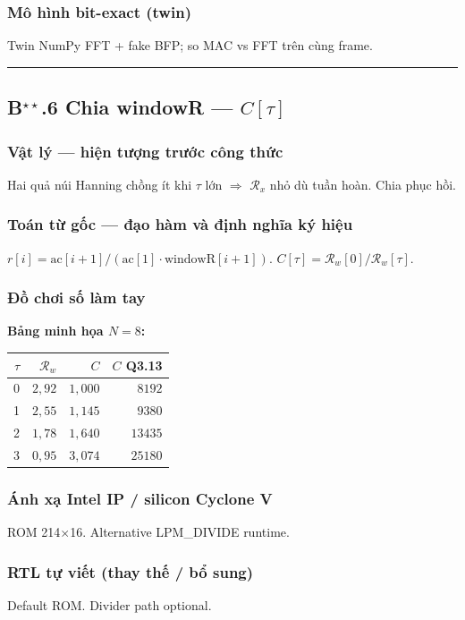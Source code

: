 \subsubsection*{Mô hình bit-exact (twin)}
Twin NumPy FFT + fake BFP; so MAC vs FFT trên cùng frame.
\vspace{0.4cm}\hrule\vspace{0.4cm}
\subsection*{B$^{\star\star}$.6 Chia windowR --- $C[\tau]$}
\subsubsection*{Vật lý --- hiện tượng trước công thức}
Hai quả núi Hanning chồng ít khi $\tau$ lớn $\Rightarrow$ $\mathcal{R}_x$ nhỏ dù tuần hoàn. Chia phục hồi.
\subsubsection*{Toán từ gốc --- đạo hàm và định nghĩa ký hiệu}
$r[i]=\mathrm{ac}[i+1]/(\mathrm{ac}[1]\cdot\mathrm{windowR}[i+1])$. $C[\tau]=\mathcal{R}_w[0]/\mathcal{R}_w[\tau]$.
\subsubsection*{Đồ chơi số làm tay}
\textbf{Bảng minh họa $N=8$:}
\begin{center}
\small
\begin{tabular}{@{}rrrr@{}}
\toprule
$\tau$ & $\mathcal{R}_w$ & $C$ & $C$ Q3.13 \\
\midrule
0 & $2{,}92$ & $1{,}000$ & $8192$ \\
1 & $2{,}55$ & $1{,}145$ & $9380$ \\
2 & $1{,}78$ & $1{,}640$ & $13435$ \\
3 & $0{,}95$ & $3{,}074$ & $25180$ \\
\bottomrule
\end{tabular}
\end{center}
\subsubsection*{Ánh xạ Intel IP / silicon Cyclone V}
ROM 214$\times$16. Alternative LPM\_DIVIDE runtime.
\subsubsection*{RTL tự viết (thay thế / bổ sung)}
Default ROM. Divider path optional.
